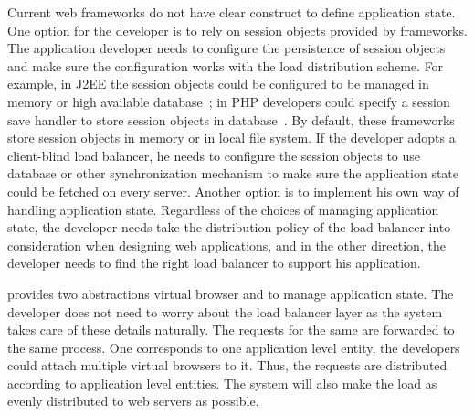
Current web frameworks do not have clear construct to define application state.
One option for the developer is to rely on session objects provided by frameworks.
The application developer needs to configure the persistence  of session objects 
and make sure the configuration works with the load distribution scheme.
For example, in J2EE the session objects could be configured to be managed in memory or
high available database~\cite{j2eedoc}; 
in PHP developers could specify a session save handler to store session objects 
in database~\cite{phpdoc}.
By default, these frameworks store session objects in memory or in local file system.
If the developer adopts a client-blind load balancer, 
he needs to configure the session objects to use database or other
synchronization mechanism to make sure the application state could be fetched on every server.
Another option is to implement his own way of handling application state.
Regardless of the choices of managing application state,
the developer needs take the distribution policy of the load balancer
into consideration when designing web applications,
and in the other direction,
the developer needs to find the right load balancer to support his application.




\cb{} provides two abstractions virtual browser and \appins{} to manage application state.
The developer does not need to worry about the load balancer layer as
the system takes care of these details naturally.
The requests for the same \appins{} are forwarded to the same \cb{} process.
One \appins{} corresponds to one application level entity, 
the developers could attach multiple virtual browsers to it.
Thus, the requests are distributed according to application level entities.
The system will also make the load as evenly distributed to web servers as possible.





